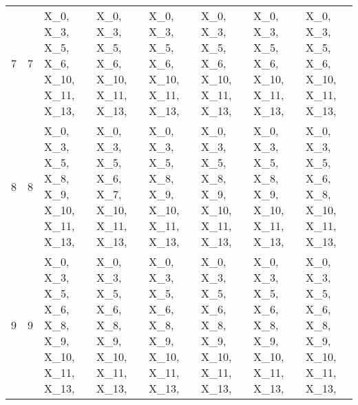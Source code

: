 \begin{tabular}{llllllll}
7 &  7 &            X\_0, X\_3, X\_5, X\_6, X\_10, X\_11, X\_13,  &            X\_0, X\_3, X\_5, X\_6, X\_10, X\_11, X\_13,  &            X\_0, X\_3, X\_5, X\_6, X\_10, X\_11, X\_13,  &            X\_0, X\_3, X\_5, X\_6, X\_10, X\_11, X\_13,  &            X\_0, X\_3, X\_5, X\_6, X\_10, X\_11, X\_13,  &            X\_0, X\_3, X\_5, X\_6, X\_10, X\_11, X\_13,  \\
8 &  8 &       X\_0, X\_3, X\_5, X\_8, X\_9, X\_10, X\_11, X\_13,  &       X\_0, X\_3, X\_5, X\_6, X\_7, X\_10, X\_11, X\_13,  &       X\_0, X\_3, X\_5, X\_8, X\_9, X\_10, X\_11, X\_13,  &       X\_0, X\_3, X\_5, X\_8, X\_9, X\_10, X\_11, X\_13,  &       X\_0, X\_3, X\_5, X\_8, X\_9, X\_10, X\_11, X\_13,  &       X\_0, X\_3, X\_5, X\_6, X\_8, X\_10, X\_11, X\_13,  \\
9 &  9 &  X\_0, X\_3, X\_5, X\_6, X\_8, X\_9, X\_10, X\_11, X\_13,  &  X\_0, X\_3, X\_5, X\_6, X\_8, X\_9, X\_10, X\_11, X\_13,  &  X\_0, X\_3, X\_5, X\_6, X\_8, X\_9, X\_10, X\_11, X\_13,  &  X\_0, X\_3, X\_5, X\_6, X\_8, X\_9, X\_10, X\_11, X\_13,  &  X\_0, X\_3, X\_5, X\_6, X\_8, X\_9, X\_10, X\_11, X\_13,  &  X\_0, X\_3, X\_5, X\_6, X\_8, X\_9, X\_10, X\_11, X\_13,  \\
\bottomrule
\end{tabular}
